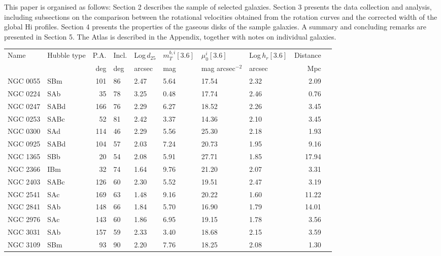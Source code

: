 \documentclass[usenatbib,useAMS]{mnras}
\begin{document}
This paper is organised as follows: Section 2 describes the sample of
selected galaxies.  Section 3 presents the data collection and analysis,
including subsections on the comparison between the rotational
velocities obtained from the rotation curves and the corrected width of
the global H{\sc i} profiles.  Section 4 presents the properties of the
gaseous disks of the sample galaxies.  A summary and concluding remarks
are presented in Section 5.  The Atlas is described in the Appendix,
together with notes on individual galaxies. 


\begin{table}
\begin{tabular}{llrlllllrl}
\hline
Name & Hubble type  & P.A. & Incl.  & Log$\,d_{25}$ & $m_{T}^{b,i} [3.6]$ & $\mu_{0}^{i} [3.6]$ & Log$\,h_{r} [3.6]$  & Distance \\
         &         & deg   & deg  & arcsec &  mag   &mag arcsec$^{-2}$& arcsec & Mpc \\
\hline
NGC 0055 & SBm     &  101  &  86  &  2.47  &  5.64  &  17.54 & 2.32 &  2.09 \\  
NGC 0224 & SAb     &   35  &  78  &  3.25  &  0.48  &  17.74 & 2.46 &  0.76 \\  
NGC 0247 & SABd    &  166  &  76  &  2.29  &  6.27  &  18.52 & 2.26 &  3.45 \\  
NGC 0253 & SABc    &   52  &  81  &  2.42  &  3.37  &  14.36 & 2.10 &  3.45 \\  
NGC 0300 & SAd     &  114  &  46  &  2.29  &  5.56  &  25.30 & 2.18 &  1.93 \\  
NGC 0925 & SABd    &  104  &  57  &  2.03  &  7.24  &  20.73 & 1.95 &  9.16 \\  
NGC 1365 & SBb     &   20  &  54  &  2.08  &  5.91  &  27.71 & 1.85 & 17.94 \\  
NGC 2366 & IBm     &   32  &  74  &  1.64  &  9.76  &  21.20 & 2.07 &  3.31 \\
NGC 2403 & SABc    &  126  &  60  &  2.30  &  5.52  &  19.51 & 2.47 &  3.19 \\  
NGC 2541 & SAc     &  169  &  63  &  1.48  &  9.16  &  20.22 & 1.60 & 11.22 \\  
NGC 2841 & SAb     &  148  &  66  &  1.84  &  5.70  &  16.90 & 1.79 & 14.01 \\ 
NGC 2976 & SAc     &  143  &  60  &  1.86  &  6.95  &  19.15 & 1.78 &  3.56 \\
NGC 3031 & SAb     &  157  &  59  &  2.33  &  3.40  &  18.68 & 2.15 &  3.59 \\  
NGC 3109 & SBm     &   93  &  90  &  2.20  &  7.76  &  18.25 & 2.08 &  1.30 \\  

\end{tabular}
\end{table}
\end{document}
